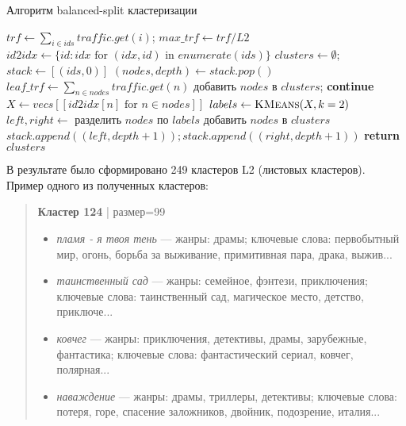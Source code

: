 \begin{itemize}
    \begin{algorithm}
    \caption{Алгоритм balanced-split кластеризации}
    \label{alg:balanced_split}
    \small
    \begin{algorithmic}[1]
    \State $trf \gets \sum_{i \in ids} traffic.get(i)$; $max\_trf \gets trf / L2$
    \State $id2idx \gets \{id: idx \text{ for } (idx, id) \text{ in } enumerate(ids)\}$
    \State $clusters \gets \emptyset$; $stack \gets [(ids, 0)]$
        \State $(nodes, depth) \gets stack.pop()$
        \State $leaf\_trf \gets \sum_{n \in nodes} traffic.get(n)$
            \State добавить $nodes$ в $clusters$; \textbf{continue}
        \EndIf
        \State $X \gets vecs[[id2idx[n] \text{ for } n \in nodes]]$
        \State $labels \gets \Call{KMeans}{X, k=2}$
        \State $left, right \gets$ разделить $nodes$ по $labels$
            \State добавить $nodes$ в $clusters$
        \Else
            \State $stack.append((left, depth + 1)); stack.append((right, depth + 1))$
        \EndIf
    \EndWhile
    \State \textbf{return} $clusters$
    \EndProcedure
    \end{algorithmic}
    \end{algorithm}
\end{itemize}

В результате было сформировано 249 кластеров L2 (листовых кластеров).
Пример одного из полученных кластеров:

\begin{quote}
\textbf{Кластер 124} | размер=99
\begin{itemize}
    \item \textit{пламя - я твоя тень} — жанры: драмы; ключевые слова: первобытный мир, огонь, борьба за выживание, примитивная пара, драка, выжив...
    \item \textit{таинственный сад} — жанры: семейное, фэнтези, приключения; ключевые слова: таинственный сад, магическое место, детство, приключе...
    \item \textit{ковчег} — жанры: приключения, детективы, драмы, зарубежные, фантастика; ключевые слова: фантастический сериал, ковчег, полярная...
    \item \textit{наваждение} — жанры: драмы, триллеры, детективы; ключевые слова: потеря, горе, спасение заложников, двойник, подозрение, италия...
\end{itemize}
\end{quote}

